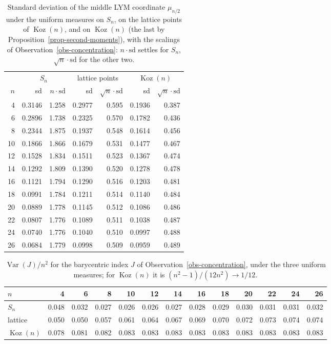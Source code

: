 \documentclass[11pt, a4paper, abstract=yes]{scrartcl}
\theoremstyle{definition}
\theoremstyle{remark}
\theoremstyle{plain}
\theoremstyle{remark}
\theoremstyle{plain}
\newcommand{\Koz}{\operatorname{Koz}}
\begin{document}
\begin{table}[htbp]\centering\small
\begin{tabular}{@{}rrrrrrr@{}}
\toprule
 & \multicolumn{2}{c}{\(S_n\)} & \multicolumn{2}{c}{lattice points} & \multicolumn{2}{c}{\(\Koz(n)\)}\\
\cmidrule(lr){2-3}\cmidrule(lr){4-5}\cmidrule(l){6-7}
\(n\) & sd & \(n\cdot\mathrm{sd}\) & sd & \(\sqrt n\cdot\mathrm{sd}\) & sd & \(\sqrt n\cdot\mathrm{sd}\)\\
\midrule
4 & 0.3146 & 1.258 & 0.2977 & 0.595 & 0.1936 & 0.387\\
6 & 0.2896 & 1.738 & 0.2325 & 0.570 & 0.1782 & 0.436\\
8 & 0.2344 & 1.875 & 0.1937 & 0.548 & 0.1614 & 0.456\\
10 & 0.1866 & 1.866 & 0.1679 & 0.531 & 0.1477 & 0.467\\
12 & 0.1528 & 1.834 & 0.1511 & 0.523 & 0.1367 & 0.474\\
14 & 0.1292 & 1.809 & 0.1390 & 0.520 & 0.1278 & 0.478\\
16 & 0.1121 & 1.794 & 0.1290 & 0.516 & 0.1203 & 0.481\\
18 & 0.0991 & 1.784 & 0.1211 & 0.514 & 0.1140 & 0.484\\
20 & 0.0889 & 1.778 & 0.1145 & 0.512 & 0.1086 & 0.486\\
22 & 0.0807 & 1.776 & 0.1089 & 0.511 & 0.1038 & 0.487\\
24 & 0.0740 & 1.776 & 0.1040 & 0.510 & 0.0997 & 0.488\\
26 & 0.0684 & 1.779 & 0.0998 & 0.509 & 0.0959 & 0.489\\
\bottomrule
\end{tabular}
\caption{Standard deviation of the middle LYM coordinate \(\mu_{n/2}\) under the uniform
measures on \(S_n\), on the lattice points of \(\Koz(n)\), and on \(\Koz(n)\) (the last by
Proposition~\ref{prop-second-moments}), with the scalings of Observation~\ref{obs-concentration}:
\(n\cdot\mathrm{sd}\) settles for \(S_n\), \(\sqrt n\cdot\mathrm{sd}\) for the other two.}
\label{tab:concentration}
\end{table}

\begin{table}[htbp]\centering\small
\setlength{\tabcolsep}{3.5pt}
\begin{tabular}{@{}lrrrrrrrrrrrr@{}}
\toprule
\(n\) & 4 & 6 & 8 & 10 & 12 & 14 & 16 & 18 & 20 & 22 & 24 & 26\\
\midrule
\(S_n\) & 0.048 & 0.032 & 0.027 & 0.026 & 0.026 & 0.027 & 0.028 & 0.029 & 0.030 & 0.031 & 0.031 & 0.032\\
lattice & 0.050 & 0.050 & 0.057 & 0.061 & 0.064 & 0.067 & 0.069 & 0.070 & 0.072 & 0.073 & 0.074 & 0.074\\
\(\Koz(n)\) & 0.078 & 0.081 & 0.082 & 0.083 & 0.083 & 0.083 & 0.083 & 0.083 & 0.083 & 0.083 & 0.083 & 0.083\\
\bottomrule
\end{tabular}
\caption{\(\operatorname{Var}(J)/n^2\) for the barycentric index \(J\) of
Observation~\ref{obs-concentration}, under the three uniform measures; for \(\Koz(n)\) it is
\((n^2-1)/(12n^2)\to1/12\).}
\label{tab:barycentric-index}
\end{table}
\end{document}

